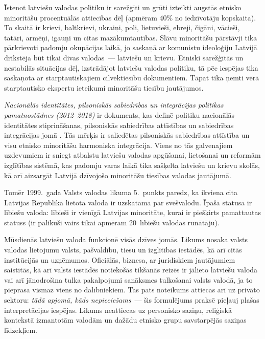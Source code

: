 \begin{multicols}{2}
Īstenot latviešu valodas politiku ir sarežģīti un grūti izteikti augstās etnisko minoritāšu procentuālās attiecības dēļ (apmēram 40\% no iedzīvotāju kopskaita).
To skaitā ir krievi, baltkrievi, ukraiņi, poļi, lietuvieši, ebreji, čigāni, vācieši, tatāri, armēņi, igauņi un citas mazākumtautības.
Slāvu minoritāšu pārstāvji tika pārkrievoti padomju okupācijas laikā, jo saskaņā ar komunistu ideoloģiju Latvijā drīkstēja būt tikai divas valodas~--- latviešu un krievu.
Etniski sarežģītās un nestabilās situācijas dēļ, izstrādājot latviešu valodas politiku, tā pēc iespējas tika saskaņota ar starptautiskajiem cilvēktiesību dokumentiem.
Tāpat tika ņemti vērā starptautisko ekspertu ieteikumi minoritāšu tiesību jautājumos.


\textit{Nacionālās identitātes, pilsoniskās sabiedrības un integrācijas politikas pamatnostādnes (2012–2018)} ir dokuments, kas definē politiku nacionālās identitātes stiprināšanas, pilsoniskās sabiedrības attīstības un sabiedrības integrācijas jomā \cite{Meta3}.
Tās mērķis ir saliedētas pilsoniskās sabiedrības attīstība un visu etnisko minoritāšu harmoniska integrācija. 
Viens no tās galvenajiem uzdevumiem ir sniegt atbalstu latviešu valodas apgūšanai, lietošanai un reformām izglītības sistēmā, kas padomju varas laikā tika sašķelta latviešu un krievu skolās, kā arī aizsargāt Latvijā dzīvojošo minoritāšu tiesības valodas jautājumā.

Tomēr 1999.~gada Valsts valodas likuma 5.~punkts paredz, ka ikviena cita Latvijas Republikā lietotā valoda ir uzskatāma par svešvalodu.
Īpašā statusā ir lībiešu valoda: lībieši ir vienīgā Latvijas minoritāte, kurai ir piešķirts pamattautas statuss (ir palikuši vairs tikai apmēram 20~lībiešu valodas runātāju).

Mūsdienās latviešu valoda funkcionē visās dzīves jomās.
Likums nosaka valsts valodas lietojumu valsts, pašvaldību, tiesu un izglītības iestādēs, kā arī citās institūcijās un uzņēmumos.
Oficiālās, biznesa, ar juridiskiem jautājumiem saistītās, kā arī valsts iestādēs notiekošās tikšanās reizēs ir jālieto latviešu valoda vai arī jānodrošina tulka pakalpojumi sanāksmes tulkošanai valsts valodā, ja to pieprasa vismaz viens no dalībniekiem.
Tas pats noteikums attiecas arī uz privāto sektoru: \textit{tādā apjomā, kāds nepieciešams}~--- šis formulējums praksē pieļauj plašas interpretācijas iespējas.
Likums neattiecas uz personisko saziņu, reliģiskā kontekstā izmantotām valodām un dažādu etnisko grupu savstarpējās saziņas līdzekļiem.


\end{multicols}
